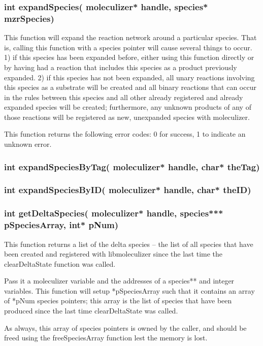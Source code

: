 \subsubsection{int expandSpecies( moleculizer* handle, species*
  mzrSpecies)}
This function will expand the reaction network around a particular
species.  That is, calling this function with a species pointer will
cause several things to occur.  1) if this species has been expanded
before, either using this function directly or by having had a
reaction that includes this species as a product previously expanded.
2) if this species has not been expanded, all unary reactions
involving this species as a substrate will be created and all binary
reactions that can occur in the rules between this species and all
other already registered and already expanded species will be created;
furthermore, any unknown products of any of those reactions will be
registered as new, unexpanded species with moleculizer.  

This function returns the following error codes: 0 for success, 1 to
indicate an unknown error.


\subsubsection{int expandSpeciesByTag( moleculizer* handle, char*
  theTag)}


\subsubsection{int expandSpeciesByID( moleculizer* handle, char*
  theID)}

\subsubsection{int getDeltaSpecies( moleculizer* handle, species***
  pSpeciesArray, int* pNum)}
This function returns a list of the delta species -- the list of all
species that have been created and registered with libmoleculizer
since the last time the clearDeltaState function was called.  

Pass it a moleculizer variable and the addresses of a species** and
integer variables.  This function will setup *pSpeciesArray such that
it contains an array of *pNum species pointers; this array is the list
of species that have been produced since the last time clearDeltaState
was called.

As always, this array of species pointers is owned by the caller, and
should be freed using the freeSpeciesArray function lest the memory is
lost.


